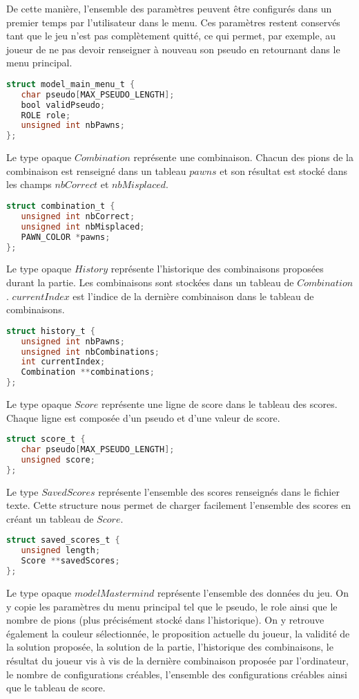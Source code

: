 \newpage

De cette manière, l'ensemble des paramètres peuvent être configurés dans un premier temps par l'utilisateur dans le menu. Ces paramètres restent conservés tant que le jeu n'est pas complètement quitté, ce qui permet, par exemple, au joueur de ne pas devoir renseigner à nouveau son pseudo en retournant dans le menu principal.
\begin{lstlisting}[language=C]
struct model_main_menu_t {
   char pseudo[MAX_PSEUDO_LENGTH];
   bool validPseudo;
   ROLE role;
   unsigned int nbPawns;
};
\end{lstlisting}

Le type opaque $Combination$ représente une combinaison. Chacun des pions de la combinaison est renseigné dans un tableau $pawns$ et son résultat est stocké dans les champs $nbCorrect$ et $nbMisplaced$.
\begin{lstlisting}[language=C]
struct combination_t {
   unsigned int nbCorrect;
   unsigned int nbMisplaced;
   PAWN_COLOR *pawns;
};
\end{lstlisting}

Le type opaque $History$ représente l'historique des combinaisons proposées durant la partie. Les combinaisons sont stockées dans un tableau de $Combination$. $currentIndex$ est l'indice de la dernière combinaison dans le tableau de combinaisons.
\begin{lstlisting}[language=C]
struct history_t {
   unsigned int nbPawns;
   unsigned int nbCombinations;
   int currentIndex;
   Combination **combinations;
};
\end{lstlisting}

Le type opaque $Score$ représente une ligne de score dans le tableau des scores. Chaque ligne est composée d'un pseudo et d'une valeur de score.
\begin{lstlisting}[language=C]
struct score_t {
   char pseudo[MAX_PSEUDO_LENGTH];
   unsigned score;
};
\end{lstlisting}

Le type $SavedScores$ représente l'ensemble des scores renseignés dans le fichier texte. Cette structure nous permet de charger facilement l'ensemble des scores en créant un tableau de $Score$.
\begin{lstlisting}[language=C]
struct saved_scores_t {
   unsigned length;
   Score **savedScores;
};
\end{lstlisting}

Le type opaque $modelMastermind$ représente l'ensemble des données du jeu. On y copie les paramètres du menu principal tel que le pseudo, le role ainsi que le nombre de pions (plus précisément stocké dans l'historique). On y retrouve également la couleur sélectionnée, le proposition actuelle du joueur, la validité de la solution proposée, la solution de la partie, l'historique des combinaisons, le résultat du joueur vis à vis de la dernière combinaison proposée par l'ordinateur, le nombre de configurations créables, l'ensemble des configurations créables ainsi que le tableau de score.

